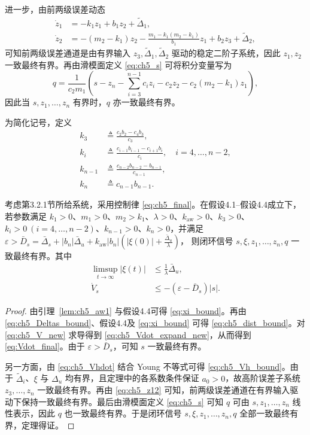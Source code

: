 进一步，由前两级误差动态
\begin{subequations}\label{eq:ch5_z12}
\begin{align}
\dot z_1&=-k_1z_1+b_1z_2+\tilde\Delta_1,\\
\dot z_2&=-(m_2-k_1)z_2-\frac{m_1-k_1(m_2-k_1)}{b_1}z_1+b_2z_3+\tilde\Delta_2,
\end{align}
\end{subequations}
可知前两级误差通道是由有界输入 $z_3,\tilde\Delta_1,\tilde\Delta_2$ 驱动的稳定二阶子系统，因此 $z_1,z_2$ 一致最终有界。再由滑模面定义 \eqref{eq:ch5_s} 可将积分变量写为
\begin{equation}
q=\frac{1}{c_2m_1}\left(s-z_n-\sum_{i=3}^{n-1}c_i z_i-c_2z_2-c_2(m_2-k_1)z_1\right),
\end{equation}
因此当 $s,z_1,\ldots,z_n$ 有界时，$q$ 亦一致最终有界。

为简化记号，定义
\begin{subequations}\label{eq:ch5_ki_def}
\begin{align}
k_3&\triangleq \frac{c_2b_2-c_4b_3}{c_3},\\
k_i&\triangleq \frac{c_{i-1}b_{i-1}-c_{i+1}b_i}{c_i},\quad i=4,\ldots,n-2,\\
k_{n-1}&\triangleq \frac{c_{n-2}b_{n-2}-b_{n-1}}{c_{n-1}},\\
k_n&\triangleq c_{n-1}b_{n-1}.
\end{align}
\end{subequations}

\begin{theorem}\label{thm:ch4_uub}
考虑第3.2.1节所给系统，采用控制律 \eqref{eq:ch5_final}。在假设4.1--假设4.4成立下，若参数满足
$k_1>0$、$m_1>0$、$m_2>k_1$、$\lambda>0$、$k_{\mathrm{aw}}>0$、$k_3>0$、$k_i>0\ (i=4,\ldots,n-2)$、$k_{n-1}>0$、$k_n>0$，并满足
$\varepsilon>\bar D_s=\bar\Delta_s + |b_n|\bar\Delta_u + k_{\mathrm{aw}}|b_n|\left(|\xi(0)|+\frac{\bar\Delta_u}{\lambda}\right)$，
则闭环信号 $s,\xi,z_1,\ldots,z_n,q$ 一致最终有界。其中
\begin{subequations}
\begin{align}
  \limsup_{t\to\infty}|\xi(t)| &\le \frac{1}{\lambda}\bar\Delta_u,\\
\dot V_s &\le -(\varepsilon-\bar D_s)|s|.
\end{align}
\end{subequations}
\end{theorem}
\begin{proof}
由引理~\ref{lem:ch5_aw1} 与假设4.4可得 \eqref{eq:xi_bound}。再由 \eqref{eq:ch5_Deltas_bound}、假设4.4及 \eqref{eq:xi_bound} 可得 \eqref{eq:ch5_dist_bound}。对 \eqref{eq:ch5_V_new} 求导得到 \eqref{eq:ch5_Vdot_expand_new}，从而得到 \eqref{eq:Vdot_final}。由于 $\varepsilon>\bar D_s$，可知 $s$ 一致最终有界。

另一方面，由 \eqref{eq:ch5_Vhdot} 结合 Young 不等式可得 \eqref{eq:ch5_Vh_bound}。由于 $\tilde\Delta_i$、$\xi$ 与 $\Delta_u$ 均有界，且定理中的各系数条件保证 $a_0>0$，故高阶误差子系统 $z_3,\ldots,z_n$ 一致最终有界。再由 \eqref{eq:ch5_z12} 可知，前两级误差通道在有界输入驱动下保持一致最终有界。最后由滑模面定义 \eqref{eq:ch5_s} 可知 $q$ 可由 $s,z_1,\ldots,z_n$ 线性表示，因此 $q$ 也一致最终有界。于是闭环信号 $s,\xi,z_1,\ldots,z_n,q$ 全部一致最终有界，定理得证。
\end{proof}

